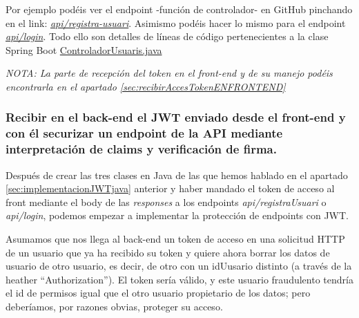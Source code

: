 \documentclass[a4paper,12pt]{report}
\begin{document}
		Por ejemplo podéis ver el endpoint -función de controlador- en GitHub pinchando en el link: \href{https://github.com/blackcub3s/mercApp/blob/78c9f573613d94a9d9de6ee046aa5d6f02f0f425/APP%20WEB/__springboot__produccio__/app/src/main/java/miApp/app/Usuaris/controlador/UsuariControlador.java#L119-L123}{\textit{api/registra-usuari}}. Asimismo podéis hacer lo mismo para el endpoint \href{https://github.com/blackcub3s/mercApp/blob/78c9f573613d94a9d9de6ee046aa5d6f02f0f425/APP%20WEB/__springboot__produccio__/app/src/main/java/miApp/app/Usuaris/controlador/UsuariControlador.java#L103-L107}{\textit{api/login}}. Todo ello son detalles de líneas de código pertenecientes a la clase Spring Boot \href{https://github.com/blackcub3s/mercApp/blob/main/APP%20WEB/__springboot__produccio__/app/src/main/java/miApp/app/Usuaris/controlador/UsuariControlador.java}{ControladorUsuaris.java}
	
		
		\textit{NOTA: La parte de recepción del token en el front-end y de su manejo podéis encontrarla en el apartado \ref{sec:recibirAccesTokenENFRONTEND}}

		
		
		
		
		
		
	
		
		\subsubsection{Recibir en el back-end el JWT enviado desde el front-end y con él securizar un endpoint de la API mediante interpretación de claims y verificación de firma.}
		\label{sec:classesSecuritzacioClaimsIfirma}
		
		Después de crear las tres clases en Java de las que hemos hablado en el apartado \ref{sec:implementacionJWTjava} anterior y haber mandado el token de acceso al front mediante el body de las \textit{responses} a los endpoints \textit{api/registraUsuari} o \textit{api/login}, podemos empezar a 
		implementar la protección de endpoints con JWT. 
		
		Asumamos que nos llega al back-end un token de acceso en una solicitud HTTP de un usuario que ya ha recibido su token y quiere ahora borrar los datos de usuario de otro usuario, es decir, de otro con un idUusario distinto (a través de la heather ``Authorization''). El token sería válido, y este usuario fraudulento tendría el id de permisos igual que el otro usuario propietario de los datos; pero deberíamos, por razones obvias, proteger su acceso.
	
\end{document}
